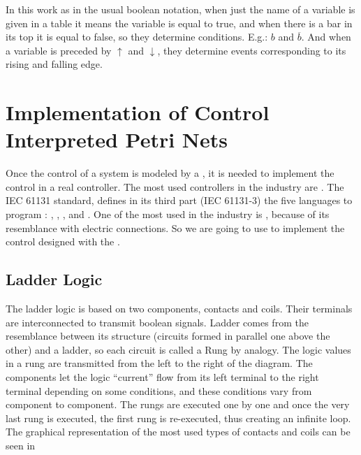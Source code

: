 In this work as in the usual boolean notation, when just the name of a variable is given in a table it means the
variable is equal to true, and when there is a bar in its top it is equal to
false, so they determine conditions. E.g.: $b$ and $\overline{b}$.
And when a variable is preceded by $\uparrow$ and $\downarrow$, they determine
events corresponding to its rising and falling edge.

\usetikzlibrary{arrows,shapes,circuits.plc.ladder,external}

\section{Implementation of Control Interpreted Petri Nets}
\label{sec:implementPetriNets}
Once the control of a system is modeled by a \CIPN, it
is needed to implement the control in a real controller. The most used
controllers in the industry are \PLCs. The IEC 61131 standard,
defines in its third part (IEC 61131-3) the 
five languages to program \PLCs: \LD, \FBD, \ST, \IL{} and \SFC. One of the most used in the industry is \LD, because of its
resemblance with electric connections. So we are going to use \LD{} to implement the
control designed with the \CIPN.

\subsection{Ladder Logic}
\label{sec:ladder}

The ladder logic is based on two components, contacts and coils. Their terminals are
interconnected to transmit boolean signals.
Ladder comes from the resemblance between its structure (circuits formed in
parallel one above the other) and a ladder, so each circuit is called a Rung by analogy. The logic
values in a \LD{} rung
are transmitted from the left to the right of the diagram. The components let
the logic ``current'' flow from its left terminal to the right terminal
depending on some conditions, and these conditions vary from component to
component.
The rungs are executed one by one and once the very last rung is executed,
the first rung is re-executed, thus creating an infinite loop. 
 The graphical representation of the most used types of contacts and coils
can be seen in 

\newlength{\ladderskip}
\newlength{\ladderrungsep}

